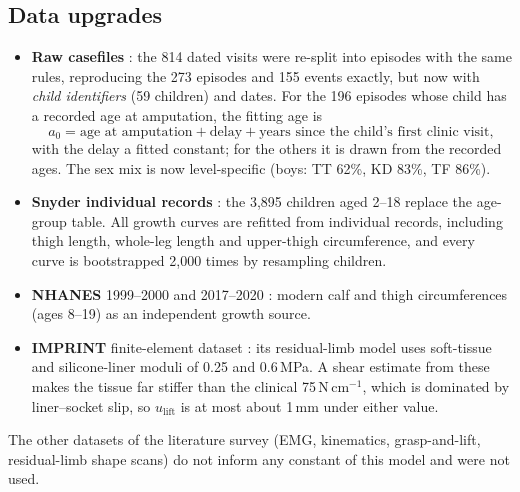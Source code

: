 \documentclass[11pt]{article}
\newcommand{\lift}{u_{\mathrm{lift}}}
\theoremstyle{definition}
\begin{document}
\subsection{Data upgrades}
\begin{itemize}[leftmargin=1.4em,itemsep=1pt]
\item \textbf{Raw casefiles} \cite{ghidiniData}: the 814 dated visits were re-split into episodes with the same rules, reproducing the 273 episodes and 155 events exactly, but now with \emph{child identifiers} (59 children) and dates. For the 196 episodes whose child has a recorded age at amputation, the fitting age is
\[
a_0=\text{age at amputation}+\text{delay}+\text{years since the child's first clinic visit},
\]
with the delay a fitted constant; for the others it is drawn from the recorded ages. The sex mix is now level-specific (boys: TT 62\%, KD 83\%, TF 86\%).
\item \textbf{Snyder individual records} \cite{anthrokids}: the 3,895 children aged 2--18 replace the age-group table. All growth curves are refitted from individual records, including thigh length, whole-leg length and upper-thigh circumference, and every curve is bootstrapped 2,000 times by resampling children.
\item \textbf{NHANES} 1999--2000 and 2017--2020 \cite{nhanes}: modern calf and thigh circumferences (ages 8--19) as an independent growth source.
\item \textbf{IMPRINT} finite-element dataset \cite{imprint}: its residual-limb model uses soft-tissue and silicone-liner moduli of 0.25 and 0.6\,MPa. A shear estimate from these makes the tissue far stiffer than the clinical 75\,N\,cm$^{-1}$, which is dominated by liner--socket slip, so $\lift$ is at most about 1\,mm under either value.
\end{itemize}
The other datasets of the literature survey (EMG, kinematics, grasp-and-lift, residual-limb shape scans) do not inform any constant of this model and were not used.
\end{document}

